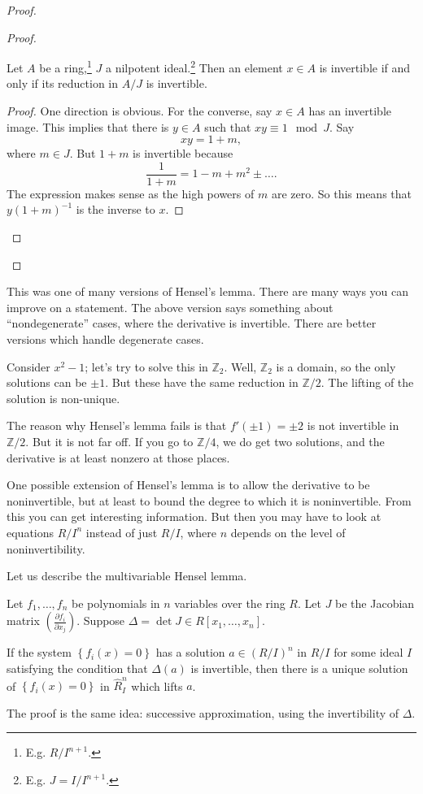 \begin{proof}
\begin{proof}
\begin{lemma} 
Let $A$ be a ring,\footnote{E.g. $R/I^{n+1}$.} $J$ a nilpotent
ideal.\footnote{E.g. $J = I/I^{n+1}$.} Then an element $x \in A$ is invertible
if and only if its reduction in $A/J$ is invertible.
\end{lemma} 
\begin{proof} 
One direction is obvious. For the converse, say $x \in A$  has an invertible
image. This implies that there is $y \in A$ such that $xy \equiv 1 \mod J$. Say
$$xy = 1+m,$$ where $m \in J$. But $1+m$ is invertible because 
\[ \frac{1}{1+m} = 1 - m + m^2 \pm \dots.  \]
The expression makes sense as the high powers of $m$ are zero. 
So this means that $y(1+m)^{-1}$ is the inverse to $x$. 
\end{proof} 
\end{proof} 
\end{proof} 

This was one of many versions of Hensel's lemma. There are many ways you can
improve on a statement. The above version says something about
``nondegenerate'' cases, where the derivative is invertible. There are better
versions which handle degenerate cases.

\begin{example} 
Consider $x^2 - 1$; let's try to solve this in $\mathbb{Z}_2$. Well,
$\mathbb{Z}_2$ is a domain, so the only solutions can be $\pm 1$. But these
have the same reduction in $\mathbb{Z}/2$. The lifting of the solution is
non-unique.

The reason why Hensel's lemma fails is that $f'(\pm 1) = \pm 2$ is not
invertible in $\mathbb{Z}/2$. But it is not far off. If you go to
$\mathbb{Z}/4$, we do get two solutions, and the derivative is at least nonzero
at those places.
\end{example} 

One possible extension of Hensel's lemma is to allow the derivative to be
noninvertible, but at least to bound the degree to which it is noninvertible.
From this you can get interesting information. 
But then you may have to look at equations $R/I^n$ instead of just $R/I$, where
$n$ depends on the level of noninvertibility.

Let us describe the multivariable Hensel lemma.

\begin{theorem} 
Let $f_1, \dots, f_n$ be polynomials in $n$ variables over the ring $R$. Let
$J$ be the Jacobian matrix $( \frac{\partial f_i}{\partial x_j})$. Suppose
$\Delta = \det J \in R[x_1, \dots, x_n]$. 

If the system $\left\{f_i(x) = 0\right\}$ has a solution $a \in (R/I)^n$ in $R/I$ for some
ideal $I$ satisfying the condition that $\Delta(a)$ is invertible, then there
is a unique solution of $\left\{f_i(x) =0\right\}$ in $\hat{R}_I^n$ which lifts $a$. 
\end{theorem} 
The proof is the same idea: successive approximation, using the invertibility
of $\Delta$. 

